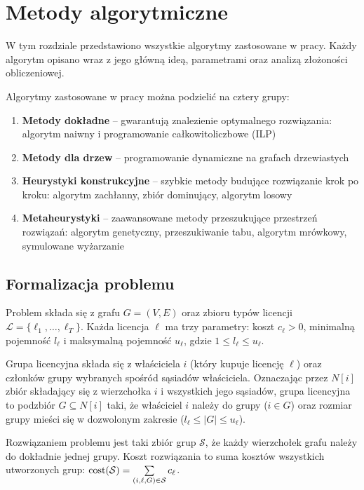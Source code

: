 \chapter{Metody algorytmiczne}\label{chap:algorithms}

W tym rozdziale przedstawiono wszystkie algorytmy zastosowane w pracy. Każdy algorytm opisano wraz z jego główną ideą, parametrami oraz analizą złożoności obliczeniowej.

Algorytmy zastosowane w pracy można podzielić na cztery grupy:
\begin{enumerate}
  \item \textbf{Metody dokładne} -- gwarantują znalezienie optymalnego rozwiązania: algorytm naiwny i programowanie całkowitoliczbowe (ILP)
  \item \textbf{Metody dla drzew} -- programowanie dynamiczne na grafach drzewiastych
  \item \textbf{Heurystyki konstrukcyjne} -- szybkie metody budujące rozwiązanie krok po kroku: algorytm zachłanny, zbiór dominujący, algorytm losowy
  \item \textbf{Metaheurystyki} -- zaawansowane metody przeszukujące przestrzeń rozwiązań: algorytm genetyczny, przeszukiwanie tabu, algorytm mrówkowy, symulowane wyżarzanie
\end{enumerate}

\section{Formalizacja problemu}\label{sec:alg-conventions}

Problem składa się z grafu $G=(V,E)$ oraz zbioru typów licencji $\mathcal{L}=\{\ell_1,\dots,\ell_T\}$. Każda licencja $\ell$ ma trzy parametry: koszt $c_\ell>0$, minimalną pojemność $l_\ell$ i maksymalną pojemność $u_\ell$, gdzie $1\le l_\ell\le u_\ell$.

Grupa licencyjna składa się z właściciela $i$ (który kupuje licencję $\ell$) oraz członków grupy wybranych spośród sąsiadów właściciela. Oznaczając przez $N[i]$ zbiór składający się z wierzchołka $i$ i wszystkich jego sąsiadów, grupa licencyjna to podzbiór $G\subseteq N[i]$ taki, że właściciel $i$ należy do grupy ($i\in G$) oraz rozmiar grupy mieści się w dozwolonym zakresie ($l_\ell\le |G|\le u_\ell$).

Rozwiązaniem problemu jest taki zbiór grup $\mathcal{S}$, że każdy wierzchołek grafu należy do dokładnie jednej grupy. Koszt rozwiązania to suma kosztów wszystkich utworzonych grup: $\operatorname{cost}(\mathcal{S})=\sum\limits_{(i,\ell,G)\in\mathcal{S}} c_\ell$.

